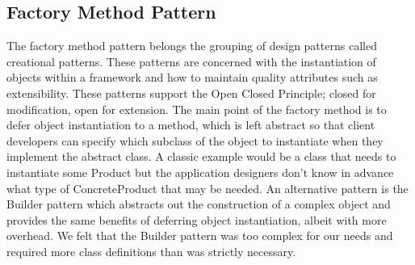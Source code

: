 \documentclass[11pt]{report}
\begin{document}
	\subsection{Factory Method Pattern}
	The factory method pattern belongs the grouping of design patterns called creational patterns. These patterns are concerned with the instantiation of objects within a framework and how to maintain quality attributes such as extensibility. These patterns support the Open Closed Principle; closed for modification, open for extension. The main point of the factory method is to defer object instantiation to a method, which is left abstract so that client developers can specify which subclass of the object to instantiate when they implement the abstract class. A classic example would be a class that needs to instantiate some Product but the application designers don't know in advance what type of ConcreteProduct that may be needed. An alternative pattern is the Builder pattern which abstracts out the construction of a complex object and provides the same benefits of deferring object instantiation, albeit with more overhead. We felt that the Builder pattern was too complex for our needs and required more class definitions than was strictly necessary. 
	
\end{document}
